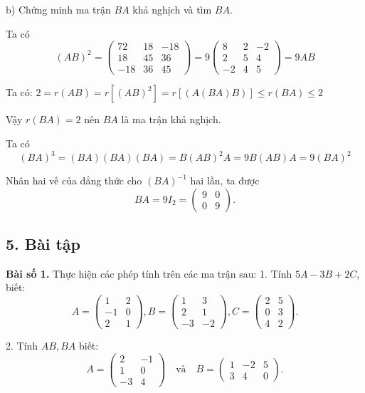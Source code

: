b) Chứng minh ma trận \( BA \) khả nghịch và tìm \( BA \).

Ta có
\[
(AB)^2 = \begin{pmatrix}
72 & 18 & -18 \\
18 & 45 & 36 \\
-18 & 36 & 45
\end{pmatrix} = 9 \begin{pmatrix}
8 & 2 & -2 \\
2 & 5 & 4 \\
-2 & 4 & 5
\end{pmatrix} = 9AB
\]

Ta có: \( 2 = r(AB) = r[(AB)^2] = r[(A(BA)B)] \le r(BA) \le 2 \)

Vậy \( r(BA) = 2 \) nên \( BA \) là ma trận khả nghịch.

Ta có
\[
(BA)^3 = (BA)(BA)(BA) = B(AB)^2 A = 9B(AB)A = 9(BA)^2
\]

Nhân hai vế của đẳng thức cho \( (BA)^{-1} \) hai lần, ta được
\[
BA = 9I_2 = \begin{pmatrix}
9 & 0 \\
0 & 9
\end{pmatrix}.
\]
\subsection*{5. Bài tập}
\textbf{Bài số 1.} Thực hiện các phép tính trên các ma trận sau:
1. Tính \( 5A - 3B + 2C \), biết:
\[
A = \begin{pmatrix}
1 & 2 \\
-1 & 0 \\
2 & 1
\end{pmatrix},
B = \begin{pmatrix}
1 & 3 \\
2 & 1 \\
-3 & -2
\end{pmatrix},
C = \begin{pmatrix}
2 & 5 \\
0 & 3 \\
4 & 2
\end{pmatrix}.
\]

2. Tính \( AB, BA \) biết:
\[
A = \begin{pmatrix}
2 & -1 \\
1 & 0 \\
-3 & 4
\end{pmatrix}
\quad \text{và} \quad
B = \begin{pmatrix}
1 & -2 & 5 \\
3 & 4 & 0
\end{pmatrix}.
\]

